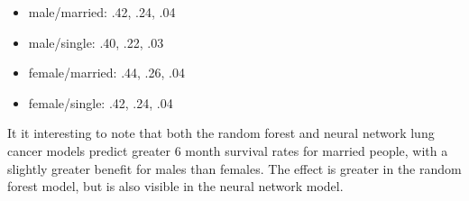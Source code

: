 \documentclass[10pt,letterpaper]{article}
\newcommand{\lorem}{{\bf LOREM}}
\newcommand{\ipsum}{{\bf IPSUM}}
\begin{document}
\begin{itemize}[noitemsep]
\item male/married: .42, .24, .04
\item male/single: .40, .22, .03
\item female/married: .44, .26, .04
\item female/single: .42, .24, .04
\end{itemize}

It it interesting to note that both the random forest and neural network lung cancer models predict greater 6 month survival rates for married people, with a slightly greater benefit for males than females. The effect is greater in the random forest model, but is also visible in the neural network model. 




\end{document}
